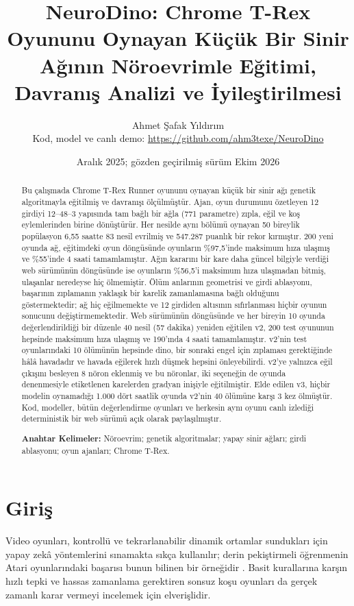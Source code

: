 \documentclass[11pt,a4paper]{article}
\title{\textbf{NeuroDino: Chrome T-Rex Oyununu Oynayan Küçük Bir Sinir Ağının Nöroevrimle Eğitimi, Davranış Analizi ve İyileştirilmesi}}
\author{Ahmet Şafak Yıldırım\\[0.5em]
\small Kod, model ve canlı demo: \url{https://github.com/ahm3texe/NeuroDino}}
\date{Aralık 2025; gözden geçirilmiş sürüm Ekim 2026}
\begin{document}
\shorthandoff{=}
\maketitle

\begin{abstract}
Bu çalışmada Chrome T-Rex Runner oyununu oynayan küçük bir sinir ağı genetik algoritmayla eğitilmiş ve davranışı ölçülmüştür. Ajan, oyun durumunu özetleyen 12 girdiyi 12--48--3 yapısında tam bağlı bir ağla (771 parametre) zıpla, eğil ve koş eylemlerinden birine dönüştürür. Her nesilde aynı bölümü oynayan 50 bireylik popülasyon 6,55 saatte 83 nesil evrilmiş ve 547.287 puanlık bir rekor kırmıştır. 200 yeni oyunda ağ, eğitimdeki oyun döngüsünde oyunların \%97,5'inde maksimum hıza ulaşmış ve \%55'inde 4 saati tamamlamıştır. Ağın kararını bir kare daha güncel bilgiyle verdiği web sürümünün döngüsünde ise oyunların \%56,5'i maksimum hıza ulaşmadan bitmiş, ulaşanlar neredeyse hiç ölmemiştir. Ölüm anlarının geometrisi ve girdi ablasyonu, başarının zıplamanın yaklaşık bir karelik zamanlamasına bağlı olduğunu göstermektedir; ağ hiç eğilmemekte ve 12 girdiden altısının sıfırlanması hiçbir oyunun sonucunu değiştirmemektedir. Web sürümünün döngüsünde ve her bireyin 10 oyunda değerlendirildiği bir düzenle 40 nesil (57 dakika) yeniden eğitilen v2, 200 test oyununun hepsinde maksimum hıza ulaşmış ve 190'ında 4 saati tamamlamıştır. v2'nin test oyunlarındaki 10 ölümünün hepsinde dino, bir sonraki engel için zıplaması gerektiğinde hâlâ havadadır ve havada eğilerek hızlı düşmek hepsini önleyebilirdi. v2'ye yalnızca eğil çıkışını besleyen 8 nöron eklenmiş ve bu nöronlar, iki seçeneğin de oyunda denenmesiyle etiketlenen karelerden gradyan inişiyle eğitilmiştir. Elde edilen v3, hiçbir modelin oynamadığı 1.000 dört saatlik oyunda v2'nin 40 ölümüne karşı 3 kez ölmüştür. Kod, modeller, bütün değerlendirme oyunları ve herkesin aynı oyunu canlı izlediği deterministik bir web sürümü açık olarak paylaşılmıştır.

\textbf{Anahtar Kelimeler:} Nöroevrim; genetik algoritmalar; yapay sinir ağları; girdi ablasyonu; oyun ajanları; Chrome T-Rex.
\end{abstract}

\section{Giriş}

Video oyunları, kontrollü ve tekrarlanabilir dinamik ortamlar sundukları için yapay zekâ yöntemlerini sınamakta sıkça kullanılır; derin pekiştirmeli öğrenmenin Atari oyunlarındaki başarısı bunun bilinen bir örneğidir \cite{mnih2015}. Basit kurallarına karşın hızlı tepki ve hassas zamanlama gerektiren sonsuz koşu oyunları da gerçek zamanlı karar vermeyi incelemek için elverişlidir.
\end{document}
